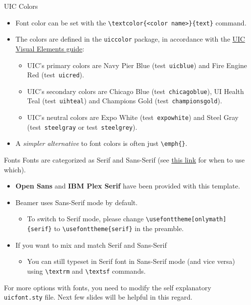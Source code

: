\documentclass{beamer}
\newcommand{\hrefcol}[2]{\textcolor{uihteal}{\href{#1}{#2}}}
\newcommand{\testcolor}[1]{\colorbox{#1}{\textcolor{#1}{test}}~\texttt{#1}}
\begin{document}

\begin{frame}[fragile]{UIC Colors}
\begin{itemize}
\item Font color can be set with the \verb|\textcolor{<color name>}{text}| command.
\item The colors are defined in the \texttt{uiccolor} package, in accordance with the \hrefcol{https://marketing.uic.edu/marketing-toolbox/university-style-guide/visual-elements/}{UIC Visual Elements guide}:
\begin{itemize}
\item UIC's primary colors are Navy Pier Blue (\testcolor{uicblue}) and Fire Engine Red (\testcolor{uicred}).
\item UIC's secondary colors are Chicago Blue (\testcolor{chicagoblue}), UI Health Teal (\testcolor{uihteal}) and Champions Gold (\testcolor{championsgold}).
\item UIC's neutral colors are Expo White (\testcolor{expowhite}) and Steel Gray (\testcolor{steelgray} or \testcolor{steelgrey}).
\end{itemize}
\item A \emph{simpler alternative} to font colors is often just \verb|\emph{}|.
\end{itemize}
\end{frame}


\begin{frame}[fragile]{Fonts}
Fonts are categorized as \textrm{Serif} and \textsf{Sans-Serif} (see \hrefcol{https://www.adobe.com/creativecloud/design/discover/serif-vs-sans-serif.html}{this link} for when to use which).

\begin{itemize}
    \item \textbf{\textsf{Open Sans}} and \textbf{\textrm{IBM Plex Serif}} have been provided with this template.
    \item Beamer uses \textsf{Sans-Serif} mode by default.
    \begin{itemize}
        \item To switch to Serif mode, please change \verb|\usefonttheme[onlymath]{serif}| to \verb|\usefonttheme{serif}| in the preamble.
    \end{itemize}
    \item If you want to mix and match Serif and Sans-Serif
    \begin{itemize}
        \item You can still typeset in Serif font in Sans-Serif mode (and vice versa) using \verb|\textrm| and \verb|\textsf| commands.
    \end{itemize}
\end{itemize}
For more options with fonts, you need to modify the self explanatory \verb|uicfont.sty| file. Next few slides will be helpful in this regard.
\end{frame}
\end{document}
